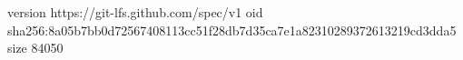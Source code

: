 version https://git-lfs.github.com/spec/v1
oid sha256:8a05b7bb0d72567408113cc51f28db7d35ca7e1a82310289372613219cd3dda5
size 84050
